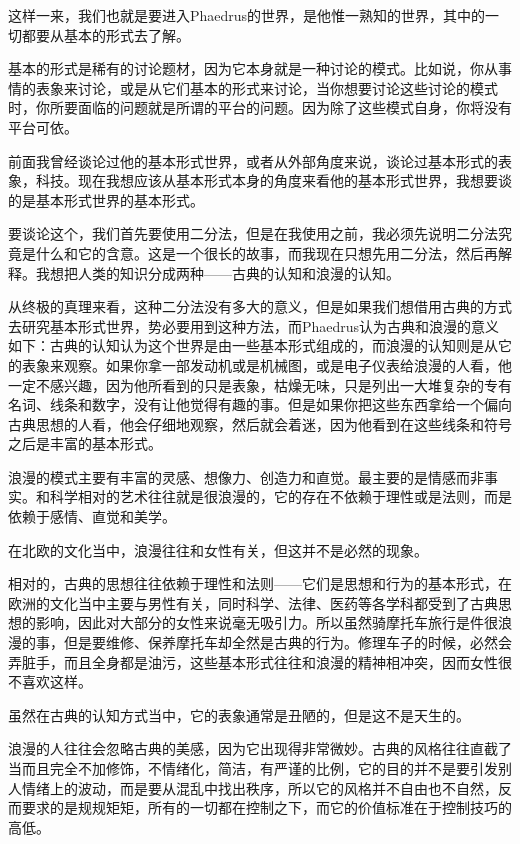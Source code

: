 \documentclass[UTF8]{article}
\begin{document}
\par 这样一来，我们也就是要进入Phaedrus的世界，是他惟一熟知的世界，其中的一切都要从基本的形式去了解。
\par 基本的形式是稀有的讨论题材，因为它本身就是一种讨论的模式。比如说，你从事情的表象来讨论，或是从它们基本的形式来讨论，当你想要讨论这些讨论的模式时，你所要面临的问题就是所谓的平台的问题。因为除了这些模式自身，你将没有平台可依。
\par 前面我曾经谈论过他的基本形式世界，或者从外部角度来说，谈论过基本形式的表象，科技。现在我想应该从基本形式本身的角度来看他的基本形式世界，我想要谈的是基本形式世界的基本形式。
\par 要谈论这个，我们首先要使用二分法，但是在我使用之前，我必须先说明二分法究竟是什么和它的含意。这是一个很长的故事，而我现在只想先用二分法，然后再解释。我想把人类的知识分成两种——古典的认知和浪漫的认知。
\par 从终极的真理来看，这种二分法没有多大的意义，但是如果我们想借用古典的方式去研究基本形式世界，势必要用到这种方法，而Phaedrus认为古典和浪漫的意义如下：古典的认知认为这个世界是由一些基本形式组成的，而浪漫的认知则是从它的表象来观察。如果你拿一部发动机或是机械图，或是电子仪表给浪漫的人看，他一定不感兴趣，因为他所看到的只是表象，枯燥无味，只是列出一大堆复杂的专有名词、线条和数字，没有让他觉得有趣的事。但是如果你把这些东西拿给一个偏向古典思想的人看，他会仔细地观察，然后就会着迷，因为他看到在这些线条和符号之后是丰富的基本形式。
\par 浪漫的模式主要有丰富的灵感、想像力、创造力和直觉。最主要的是情感而非事实。和科学相对的艺术往往就是很浪漫的，它的存在不依赖于理性或是法则，而是依赖于感情、直觉和美学。
\par 在北欧的文化当中，浪漫往往和女性有关，但这并不是必然的现象。
\par 相对的，古典的思想往往依赖于理性和法则——它们是思想和行为的基本形式，在欧洲的文化当中主要与男性有关，同时科学、法律、医药等各学科都受到了古典思想的影响，因此对大部分的女性来说毫无吸引力。所以虽然骑摩托车旅行是件很浪漫的事，但是要维修、保养摩托车却全然是古典的行为。修理车子的时候，必然会弄脏手，而且全身都是油污，这些基本形式往往和浪漫的精神相冲突，因而女性很不喜欢这样。
\par 虽然在古典的认知方式当中，它的表象通常是丑陋的，但是这不是天生的。
\par 浪漫的人往往会忽略古典的美感，因为它出现得非常微妙。古典的风格往往直截了当而且完全不加修饰，不情绪化，简洁，有严谨的比例，它的目的并不是要引发别人情绪上的波动，而是要从混乱中找出秩序，所以它的风格并不自由也不自然，反而要求的是规规矩矩，所有的一切都在控制之下，而它的价值标准在于控制技巧的高低。
\end{document}
